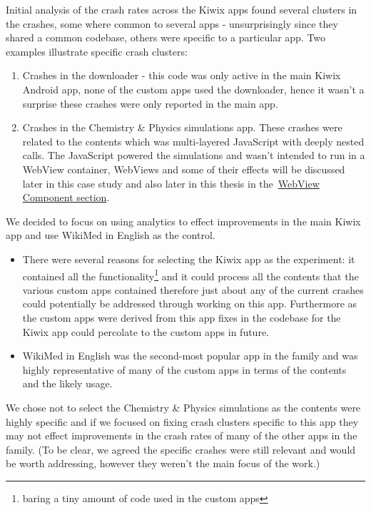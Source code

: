 Initial analysis of the crash rates across the Kiwix apps found several clusters in the crashes, some where common to several apps - unsurprisingly since they shared a common codebase, others were specific to a particular app. Two examples illustrate specific crash clusters:
\begin{enumerate}
    \item Crashes in the downloader - this code was only active in the main Kiwix Android app, none of the custom apps used the downloader, hence it wasn't a surprise these crashes were only reported in the main app.
    \item Crashes in the Chemistry \& Physics simulations app. These crashes were related to the contents which was multi-layered JavaScript with deeply nested calls. The JavaScript powered the simulations and wasn't intended to run in a WebView container, WebViews and some of their effects will be discussed later in this case study and also later in this thesis in the~\href{section-webview-component}{WebView Component section}.
\end{enumerate}

We decided to focus on using analytics to effect improvements in the main Kiwix app and use WikiMed in English as the control. 
\begin{itemize}
    \item There were several reasons for selecting the Kiwix app as the experiment: it contained all the functionality\footnote{baring a tiny amount of code used in the custom apps} and it could process all the contents that the various custom apps contained therefore just about any of the current crashes could potentially be addressed through working on this app. Furthermore as the custom apps were derived from this app fixes in the codebase for the Kiwix app could percolate to the custom apps in future. 
    \item WikiMed in English was the second-most popular app in the family and was highly representative of many of the custom apps in terms of the contents and the likely usage.
\end{itemize}

We chose not to select the Chemistry \& Physics simulations as the contents were highly specific and if we focused on fixing crash clusters specific to this app they may not effect improvements in the crash rates of many of the other apps in the family. (To be clear, we agreed the specific crashes were still relevant and would be worth addressing, however they weren't the main focus of the work.) 


